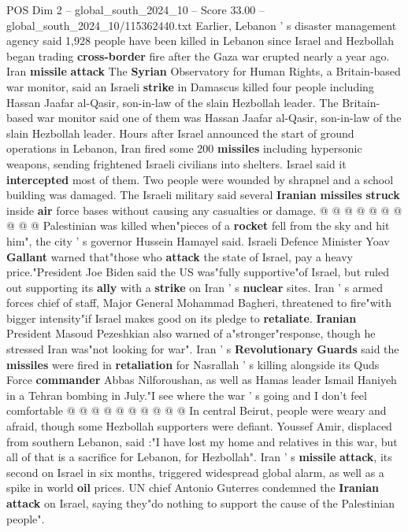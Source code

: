 \begin{textsample}{POS Dim 2 – global\_south\_2024\_10 – Score 33.00 – global\_south\_2024\_10/115362440.txt}
Earlier, Lebanon ' s disaster management agency said 1,928 people have been killed in Lebanon since Israel and Hezbollah began trading \textbf{cross-border} fire after the Gaza war erupted nearly a year ago.
Iran \textbf{missile} \textbf{attack} The \textbf{Syrian} Observatory for Human Rights, a Britain-based war monitor, said an Israeli \textbf{strike} in Damascus killed four people including Hassan Jaafar al-Qasir, son-in-law of the slain Hezbollah leader.
The Britain-based war monitor said one of them was Hassan Jaafar al-Qasir, son-in-law of the slain Hezbollah leader.
Hours after Israel announced the start of ground operations in Lebanon, Iran fired some 200 \textbf{missiles} including hypersonic weapons, sending frightened Israeli civilians into shelters.
Israel said it \textbf{intercepted} most of them.
Two people were wounded by shrapnel and a school building was damaged.
The Israeli military said several \textbf{Iranian} \textbf{missiles} \textbf{struck} inside \textbf{air} force bases without causing any casualties or damage. @ @ @ @ @ @ @ @ @ @ Palestinian was killed when"pieces of a \textbf{rocket} fell from the sky and hit him", the city ' s governor Hussein Hamayel said.
Israeli Defence Minister Yoav \textbf{Gallant} warned that"those who \textbf{attack} the state of Israel, pay a heavy price."President Joe Biden said the US was"fully supportive"of Israel, but ruled out supporting its \textbf{ally} with a \textbf{strike} on Iran ' s \textbf{nuclear} sites.
Iran ' s armed forces chief of staff, Major General Mohammad Bagheri, threatened to fire"with bigger intensity"if Israel makes good on its pledge to \textbf{retaliate}. \textbf{Iranian} President Masoud Pezeshkian also warned of a"stronger"response, though he stressed Iran was"not looking for war".
Iran ' s \textbf{Revolutionary} \textbf{Guards} said the \textbf{missiles} were fired in \textbf{retaliation} for Nasrallah ' s killing alongside its Quds Force \textbf{commander} Abbas Nilforoushan, as well as Hamas leader Ismail Haniyeh in a Tehran bombing in July."I see where the war ' s going and I don't feel comfortable @ @ @ @ @ @ @ @ @ @ In central Beirut, people were weary and afraid, though some Hezbollah supporters were defiant.
Youssef Amir, displaced from southern Lebanon, said :"I have lost my home and relatives in this war, but all of that is a sacrifice for Lebanon, for Hezbollah".
Iran ' s \textbf{missile} \textbf{attack}, its second on Israel in six months, triggered widespread global alarm, as well as a spike in world \textbf{oil} prices.
UN chief Antonio Guterres condemned the \textbf{Iranian} \textbf{attack} on Israel, saying they"do nothing to support the cause of the Palestinian people".

\end{textsample}
